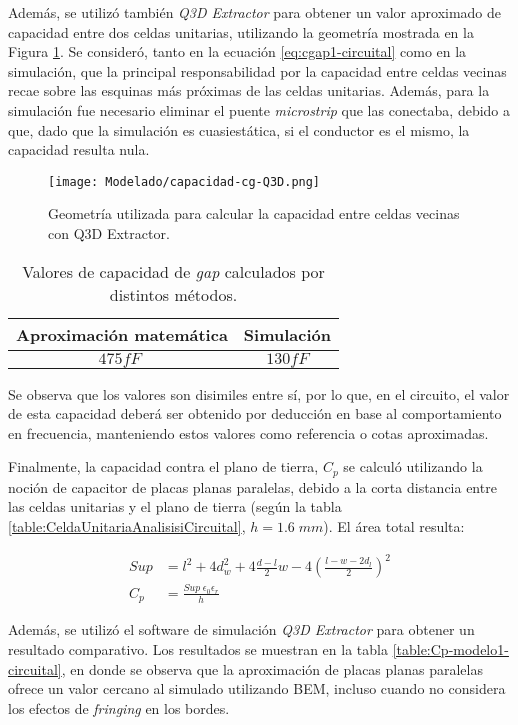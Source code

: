 Además, se utilizó también \textit{Q3D Extractor} para obtener un valor aproximado de capacidad entre dos celdas unitarias, utilizando la geometría mostrada en la Figura \ref{fig:capacidad-cg-Q3D}. Se consideró, tanto en la ecuación \ref{eq:cgap1-circuital} como en la simulación, que la principal responsabilidad por la capacidad entre celdas vecinas recae sobre las esquinas más próximas de las celdas unitarias. Además, para la simulación fue necesario eliminar el puente \textit{microstrip} que las conectaba, debido a que, dado que la simulación es cuasiestática, si el conductor es el mismo, la capacidad resulta nula.

\begin{figure}[h]
	\centering
	\texttt{[image: Modelado/capacidad-cg-Q3D.png]}
	\caption{Geometría utilizada para calcular la capacidad entre celdas vecinas con Q3D Extractor.}
	\label{fig:capacidad-cg-Q3D}
\end{figure}

\begin{table}
	\centering
	\begin{tabular}{|c|c|}
		\hline 
		Aproximación matemática & Simulación \\ 
		\hline 
		$475 fF\;$ & $130 fF$\\ 
		\hline 
	\end{tabular}
	\caption{Valores de capacidad de \textit{gap} calculados por distintos métodos.}
	\label{table:Cg}
\end{table}

Se observa que los valores son disimiles entre sí, por lo que, en el circuito, el valor de esta capacidad deberá ser obtenido por deducción en base al comportamiento en frecuencia, manteniendo estos valores como referencia o cotas aproximadas.

Finalmente, la capacidad contra el plano de tierra, $C_p$ se calculó utilizando la noción de capacitor de placas planas paralelas, debido a la corta distancia entre las celdas unitarias y el plano de tierra (según la tabla \ref{table:CeldaUnitariaAnalisisiCircuital}, $h=1.6\;mm$). El área total resulta:

\begin{align}
	Sup &= l^2+4 d_w^2+4 \frac{d-l}{2} w - 4 \left(\frac{l-w-2 d_l}{2}\right)^2 \\
	C_{p} &= \frac{Sup\; \epsilon_0 \epsilon_r}{h}
\end{align}

Además, se utilizó el software de simulación \textit{Q3D Extractor} para obtener un resultado comparativo. Los resultados se muestran en la tabla \ref{table:Cp-modelo1-circuital}, en donde se observa que la aproximación de placas planas paralelas ofrece un valor cercano al simulado utilizando BEM, incluso cuando no considera los efectos de \textit{fringing} en los bordes.

